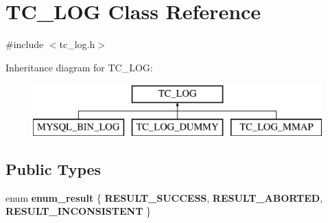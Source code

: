 \hypertarget{classTC__LOG}{}\section{T\+C\+\_\+\+L\+OG Class Reference}
\label{classTC__LOG}


{\ttfamily \#include $<$tc\+\_\+log.\+h$>$}

Inheritance diagram for T\+C\+\_\+\+L\+OG\+:\begin{figure}[H]
\begin{center}
\leavevmode
\includegraphics[height=2.000000cm]{classTC__LOG}
\end{center}
\end{figure}
\subsection*{Public Types}
\begin{DoxyCompactItemize}
\item 
\mbox{\label{classTC__LOG_ae6d54c7c6922b5ce426744f35602e9af}} 
enum {\bfseries enum\+\_\+result} \{ {\bfseries R\+E\+S\+U\+L\+T\+\_\+\+S\+U\+C\+C\+E\+SS}, 
{\bfseries R\+E\+S\+U\+L\+T\+\_\+\+A\+B\+O\+R\+T\+ED}, 
{\bfseries R\+E\+S\+U\+L\+T\+\_\+\+I\+N\+C\+O\+N\+S\+I\+S\+T\+E\+NT}
 \}
\end{DoxyCompactItemize}
